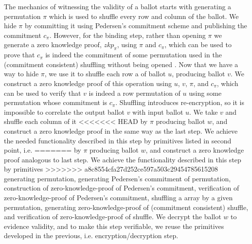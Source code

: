 \documentclass{llncs}
\begin{document}
The mechanics of witnessing the validity of a ballot starts with generating a 
permutation $\pi$ which is used to shuffle every row and column of the ballot.
We hide $\pi$ by committing it using Pedersen's 
commitment scheme 
and publishing  the commitment $c_{\pi}$. However, for the binding step, rather 
than opening $\pi$ we generate a zero knowledge proof, $zkp_{\pi}$, 
using $\pi$ and $c_{\pi}$, which can 
be  used to prove that $c_{\pi}$ is indeed the commitment of some permutation
used in the (commitment consistent) shuffling 
 without being opened \cite{Wikstrom:2009:CPS}. Now that we have a way 
 to hide $\pi$, we use it to shuffle each row a of 
ballot $u$, producing ballot $v$. We construct a zero knowledge proof 
of this operation using $u$, $v$, $\pi$, and $c_{\pi}$, which can be used 
to verify that $v$ is indeed a row permutation of $u$ using some permutation 
whose commitment is $c_{\pi}$. Shuffling 
introduces re-encryption, so it is impossible to correlate the output
ballot $v$ with input ballot $u$.  We take $v$ and shuffle each column of it 
<<<<<<< HEAD
by $\pi$ producing ballot $w$, and construct a zero knowledge proof in the same 
way as the last step. We achieve the needed functionality described in this step
by primitives listed in second point, i.e. 
=======
by $\pi$ producing ballot $w$, and construct a zero knowledge proof 
analogous to last step. We achieve the functionality described in this step
by primitives 
>>>>>>> a8c8554cfa27d252ce597a503c29454785615208
generating permutation, generating  Pedersen's 
commitment of permutation, construction of 
zero-knowledge-proof of Pedersen's commitment, verification of 
zero-knowledge-proof of Pedersen's commitment, shuffling a array 
by a given permutation, 
generating zero-knowledge-proof of (commitment consistent) shuffle, 
and verification of zero-knowledge-proof of shuffle.
We decrypt the ballot $w$ to evidence validity, and to make this step
 verifiable, we reuse the primitives developed in the
 previous, i.e. encryption/decryption step.
\end{document}
